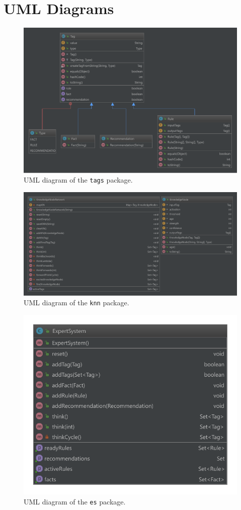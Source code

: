 \documentclass[titlepage,11pt]{article}
\newcommand{\code}[1]{\texttt{#1}}
\begin{document}
\clearpage
\onecolumn
\appendix

\section{UML Diagrams}
\label{sec:uml}

\begin{figure}[!htb]
	\centering
	\includegraphics[width=\columnwidth]{figures/uml_tags.pdf}
	\caption{UML diagram of the \code{tags} package.}
	\label{uml_tags}
\end{figure}

\begin{figure}[!htb]
	\centering
	\includegraphics[width=\columnwidth]{figures/uml_knn.pdf}
	\caption{UML diagram of the \code{knn} package.}
	\label{uml_knn}
\end{figure}

\begin{figure}[!htb]
	\centering
	\includegraphics[width=0.5\columnwidth]{figures/uml_es.pdf}
	\caption{UML diagram of the \code{es} package.}
	\label{uml_es}
\end{figure}
\end{document}
